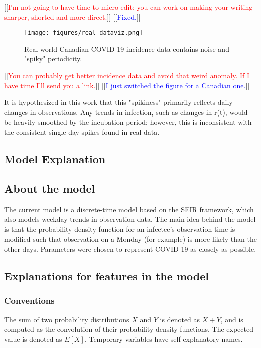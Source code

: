 \documentclass{article}
\newcommand{\jd}[1]{[[\textcolor{red}{#1}]]}  \newcommand{\msComment}[1]{[[\textcolor{blue}{#1}]]}
\newcommand{\jd}[1]{} \newcommand{\msComment}[1]{}
\begin{document}
\jd{I'm not going to have time to micro-edit; you can work on making your writing sharper, shorted and more direct.} \msComment{Fixed.}

\clearpage
\begin{figure}[h!]
\centering
\texttt{[image: figures/real\_dataviz.png]}
\caption{Real-world Canadian COVID-19 incidence data contains noise and "spiky" periodicity. \cite{mli}}
\end{figure}
\jd{You can probably get better incidence data and avoid that weird anomaly. If I have time I'll send you a link.} \msComment{I just switched the figure for a Canadian one.}


It is hypothesized in this work that this "spikiness" primarily reflects daily changes in observations. Any trends in infection, such as changes in r(t), would be heavily smoothed by the incubation period; however, this is inconsistent with the consistent single-day spikes found in real data.

\subsection{Model Explanation}

\subsection{About the model}
The current model is a discrete-time model based on the SEIR framework, which also models weekday trends in observation data. The main idea behind the model is that the probability density function for an infectee's observation time is modified such that observation on a Monday (for example) is more likely than the other days. Parameters were chosen to represent COVID-19 as closely as possible.

\subsection{Explanations for features in the model}

\subsubsection{Conventions}
The sum of two probability distributions $X$ and $Y$ is denoted as $X+Y$, and is computed as the convolution of their probability density functions. The expected value is denoted as $E[X]$. Temporary variables have self-explanatory names.
\end{document}
